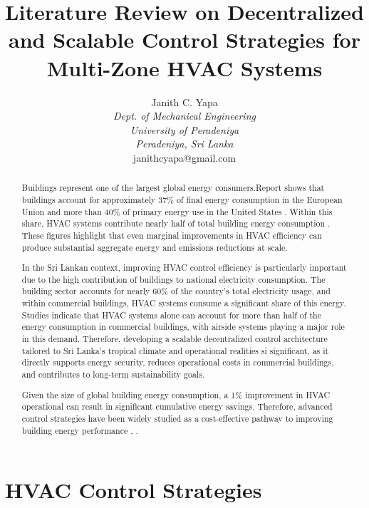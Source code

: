 \documentclass[twocolumn,11pt,a4paper]{article}
\title{\textbf{Literature Review on Decentralized and Scalable Control Strategies for Multi-Zone HVAC Systems}}
\author{
    Janith C. Yapa \\
    \textit{Dept. of Mechanical Engineering} \\
    \textit{University of Peradeniya} \\
    \textit{Peradeniya, Sri Lanka} \\
    janithcyapa@gmail.com
}
\date{}
\begin{document}
\maketitle

\begin{abstract}

Buildings represent one of the largest global energy consumers.Report shows that buildings account for approximately 37\% of final energy consumption in the European Union and more than 40\% of primary energy use in the United States \cite{perez-lombardReviewBuildingsEnergy2008}. Within this share, HVAC systems contribute nearly half of total building energy consumption \cite{aframTheoryApplicationsHVAC2014}. These figures highlight that even marginal improvements in HVAC efficiency can produce substantial aggregate energy and emissions reductions at scale.

In the Sri Lankan context, improving HVAC control efficiency is particularly important due to the high contribution of buildings to national electricity consumption. The building sector accounts for nearly 60\% of the country’s total electricity usage, and within commercial buildings, HVAC systems consume a significant share of this energy\cite{universityofmoratuwasrilankaGuidelinesOptimisingEnergy2025}. Studies indicate that HVAC systems alone can account for more than half of the energy consumption in commercial buildings, with airside systems playing a major role in this demand\cite{universityofmoratuwasrilankaGuidelinesOptimisingEnergy2025}. Therefore, developing a scalable decentralized control architecture tailored to Sri Lanka’s tropical climate and operational realities si significant, as it directly supports energy security, reduces operational costs in commercial buildings, and contributes to long-term sustainability goals.

Given the size of global building energy consumption, a 1\% improvement in HVAC operational can result in significant cumulative energy savings. Therefore, advanced control strategies have been widely studied as a cost-effective pathway to improving building energy performance \cite{aframTheoryApplicationsHVAC2014}, \cite{wangSupervisoryOptimalControl2008}.


\end{abstract}

\section{HVAC Control Strategies}
\end{document}
